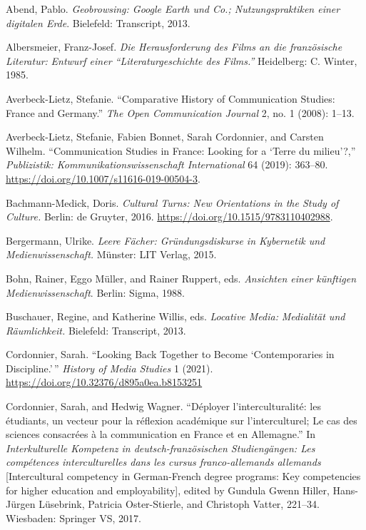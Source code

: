 \documentclass{tufte-handout}
\begin{document}
\begin{hangparas}{.25in}{1} 



Abend, Pablo. \emph{Geobrowsing: Google Earth und Co.; Nutzungspraktiken
einer digitalen Erde}. Bielefeld: Transcript, 2013.

Albersmeier, Franz-Josef. \emph{Die Herausforderung des Films an die
französische Literatur:} \emph{Entwurf einer ``Literaturgeschichte des
Films.''} Heidelberg: C. Winter, 1985.

Averbeck-Lietz, Stefanie. ``Comparative History of Communication
Studies: France and Germany.'' \emph{The Open Communication Journal} 2,
no. 1 (2008): 1--13.

Averbeck-Lietz, Stefanie, Fabien Bonnet, Sarah Cordonnier, and Carsten
Wilhelm. ``Communication Studies in France: Looking for a `Terre du
milieu'?,'' \emph{Publizistik: Kommunikationswissenschaft International}
64 (2019): 363--80. \url{https://doi.org/10.1007/s11616-019-00504-3}.

Bachmann-Medick, Doris. \emph{Cultural Turns: New Orientations in the
Study of Culture.} Berlin: de Gruyter, 2016.
\url{https://doi.org/10.1515/9783110402988}.

Bergermann, Ulrike. \emph{Leere Fächer: Gründungsdiskurse in Kybernetik
und Medienwissenschaft.} Münster: LIT Verlag, 2015.

Bohn, Rainer, Eggo Müller, and Rainer Ruppert, eds. \emph{Ansichten
einer künftigen Medienwissenschaft}. Berlin: Sigma, 1988.

Buschauer, Regine, and Katherine Willis, eds. \emph{Locative Media:}
\emph{Medialität und Räumlichkeit.} Bielefeld: Transcript, 2013.

Cordonnier, Sarah. ``Looking Back Together to Become `Contemporaries in
Discipline.'\,'' \emph{History of Media Studies} 1 (2021).
\url{https://doi.org/10.32376/d895a0ea.b8153251}

Cordonnier, Sarah, and Hedwig Wagner. ``Déployer l'interculturalité: les
étudiants, un vecteur pour la réflexion académique sur l'interculturel;
Le cas des sciences consacrées à la communication en France et en
Allemagne.'' In \emph{Interkulturelle Kompetenz in deutsch-französischen
Studiengängen: Les compétences interculturelles dans les cursus
franco-allemands allemands} {[}Intercultural competency in German-French
degree programs: Key competencies for higher education and
employability{]}, edited by Gundula Gwenn Hiller, Hans-Jürgen Lüsebrink,
Patricia Oster-Stierle, and Christoph Vatter, 221--34. Wiesbaden:
Springer VS, 2017.


\end{hangparas}
\end{document}
